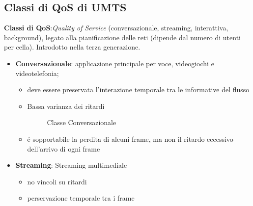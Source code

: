 \documentclass{article}
\begin{document}
    \subsection{Classi di QoS di UMTS}
    \textbf{Classi di QoS}:\@\textit{Quality of Service} (conversazionale, streaming, interattiva, background), legato alla pianificazione delle reti (dipende dal numero di utenti per cella). Introdotto nella terza generazione.
    \begin{itemize}
        \item \textbf{Conversazionale}: applicazione principale per voce, videogiochi e videotelefonia;
            \begin{itemize}
                \item deve essere preservata l'interazione temporale tra le informative del flusso
                \item Bassa varianza dei ritardi

                    \begin{figure}[h]
                        \centering


                        \caption{Classe Conversazionale}
                    \end{figure}
                \item \'e sopportabile la perdita di alcuni frame, ma non il ritardo eccessivo dell'arrivo di ogni frame

            \end{itemize}

        \item \textbf{Streaming}: Streaming multimediale
            \begin{itemize}
                \item no vincoli su ritardi
                \item perservazione temporale tra i frame


\end{itemize}
\end{itemize}
\end{document}

